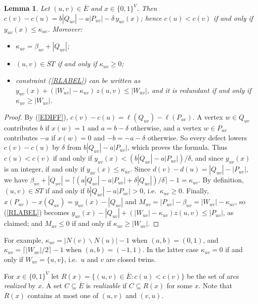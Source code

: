 \documentclass[a4paper,11pt]{article}
\newcommand{\ie}{{i.e.~}}
\newcommand{\Eb}{\overline{E}}
\newtheorem{lem}{Lemma}
\theoremstyle{definition}
\begin{document}
\begin{lem} \label{LREAL}
Let $(u,v) \in \Eb$ and $x \in \{0,1\}^V$. Then $c(v) - c(u) = b|Q_{uv}| - a|P_{uv}| - \delta\,y_{uv}(x)$; hence
$c(u) < c(v)$ if and only if $y_{uv}(x) \leq \kappa_{uv}$. Moreover:
\begin{itemize}
\item $\kappa_{uv} = \beta_{uv} + |Q_{uv}|$;
\item $(u,v) \in ST$ if and only if $\kappa_{uv} \geq 0$;
\item constraint (\ref{RLABEL}) can be written as $y_{uv}(x) + (|W_{uv}| - \kappa_{uv})\, z(u,v) \leq |W_{uv}|$, and it is redundant
if and only if $\kappa_{uv} \geq |W_{uv}|$.
\end{itemize}
\end{lem}
\begin{proof}
By (\ref{EDIFF}), $c(v) - c(u) = \ell(Q_{uv}) - \ell(P_{uv})$. A vertex $w \in Q_{uv}$ contributes $b$ if $x(w) = 1$ and $a = b - \delta$
otherwise, and a vertex $w \in P_{uv}$ contributes $-a$ if $x(w) = 0$ and $-b = -a - \delta$ otherwise. So every defect lowers
$c(v) - c(u)$ by $\delta$ from $b|Q_{uv}| - a|P_{uv}|$, which proves the formula. Thus $c(u) < c(v)$ if and only if
$y_{uv}(x) < (b|Q_{uv}| - a|P_{uv}|)/\delta$, and since $y_{uv}(x)$ is an integer, if and only if $y_{uv}(x) \leq \kappa_{uv}$.
Since $d(v) - d(u) = |Q_{uv}| - |P_{uv}|$, we have
$\beta_{uv} + |Q_{uv}| = \lceil (a|Q_{uv}| - a|P_{uv}| + \delta |Q_{uv}|)/\delta \rceil - 1 = \kappa_{uv}$.
By definition, $(u,v) \in ST$ if and only if $b|Q_{uv}| - a|P_{uv}| > 0$, \ie $\kappa_{uv} \geq 0$. Finally,
$x(P_{uv}) - x(Q_{uv}) = y_{uv}(x) - |Q_{uv}|$ and $M_{uv} = |P_{uv}| - \beta_{uv} = |W_{uv}| - \kappa_{uv}$, so (\ref{RLABEL}) becomes
$y_{uv}(x) - |Q_{uv}| + (|W_{uv}| - \kappa_{uv}) z(u,v) \leq |P_{uv}|$, as claimed; and $M_{uv} \leq 0$ if and only if
$\kappa_{uv} \geq |W_{uv}|$.
\end{proof}

For example, $\kappa_{uv} = |N(v) \backslash N(u)| - 1$ when $(a,b) = (0,1)$, and $\kappa_{uv} = \lceil |W_{uv}|/2 \rceil - 1$ when
$(a,b) = (-1,1)$. In the latter case $\kappa_{uv} = 0$ if and only if $W_{uv} = \{u,v\}$, \ie $u$ and $v$ are closed twins.

For $x \in \{0,1\}^V$ let $R(x) = \{ (u,v) \in \Eb : c(u) < c(v) \}$ be the set of arcs \emph{realized} by $x$. A set $C \subseteq \Eb$
is \emph{realizable} if $C \subseteq R(x)$ for some $x$. Note that $R(x)$ contains at most one of $(u,v)$ and $(v,u)$.
\end{document}

